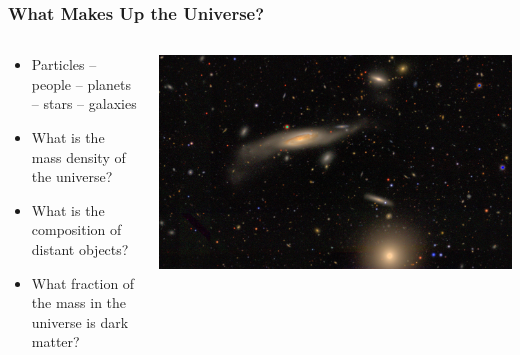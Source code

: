 \documentclass{beamer}
\begin{document}
\frame
{

    \frametitle{What Makes Up the Universe?}


    \begin{columns}
        \begin{column}{0.5\textwidth}
            \begin{itemize}


                \item Particles -- people -- planets -- stars -- galaxies

                \item What is the mass density of the universe?

                \item What is the composition of distant objects?

                \item What fraction of the mass in the universe
                    is dark matter?

            \end{itemize}
        \end{column}
        \begin{column}{0.5\textwidth}
            \begin{center}
                \includegraphics[width=1.2\textwidth, angle=90]{DES0056-5248_gri_crop.jpg}
            \end{center}
        \end{column}
    \end{columns}


}
\end{document}

